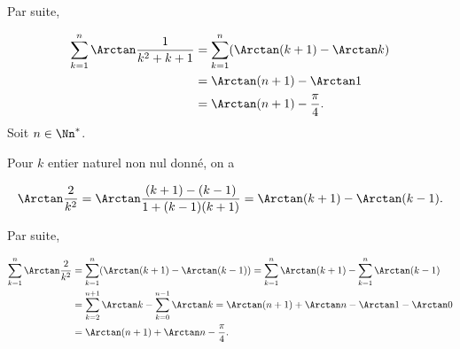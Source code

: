 {\begin{enumerate}
{Par suite,

\begin{align*}
\sum_{k=1}^{n}\Arctan\frac{1}{k^2+k+1} &= \sum_{k=1}^{n}(\Arctan(k+1)-\Arctan k) \\
&= \Arctan(n+1)-\Arctan1 \\
&= \Arctan(n+1)-\frac{\pi}{4}.
\end{align*}
Soit $n\in\Nn^*$.

Pour $k$ entier naturel non nul donné, on a

$$\Arctan\frac{2}{k^2}=\Arctan\frac{(k+1)-(k-1)}{1+(k-1)(k+1)}=\Arctan(k+1)-\Arctan(k-1).$$

Par suite,

\begin{align*}
\sum_{k=1}^{n}\Arctan\frac{2}{k^2}&=\sum_{k=1}^{n}(\Arctan(k+1)-\Arctan
(k-1))=\sum_{k=1}^{n}\Arctan(k+1)-\sum_{k=1}^{n}\Arctan(k-1)\\
 &=\sum_{k=2}^{n+1}\Arctan k-\sum_{k=0}^{n-1}\Arctan k=\Arctan(n+1)+\Arctan n-\Arctan1-\Arctan0\\
 &=\Arctan(n+1)+\Arctan n-\frac{\pi}{4}.
\end{align*}
}
\end{enumerate}
}
